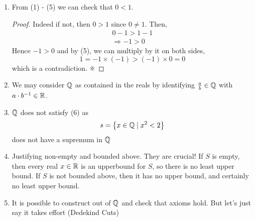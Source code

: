 \documentclass{article}
\begin{document}
\begin{remark}\leavevmode
    \begin{enumerate}
        \item From (1) - (5) we can check that $0 < 1$.
        \begin{proof}
            Indeed if not, then $0 > 1$ since $0 \neq 1$.
            Then,
            \begin{align*}
                0 -1 > 1 - 1 \\
                \Rightarrow -1 > 0
            \end{align*}
            Hence $-1 > 0$ and by (5), we can multiply by it on both sides,
            \[
                1 = -1 \times (-1) > (-1) \times 0 = 0   
            \]
            which is a contradiction. $\contradiction$
        \end{proof}
        \item We may consider $\mathbb{Q}$ as contained in the reals by identifying $\frac{a}{b} \in \mathbb{Q}$ with $a \cdot b^{-1} \in \mathbb{R}$.
        \item $\mathbb{Q}$ does not satisfy (6) as 
        \[
            s = \left\{ x \in \mathbb{Q} \mid x^2 < 2 \right\}  
        \]
        does not have a supremum in $\mathbb{Q}$
        \item Justifying non-empty and bounded above. They are crucial!
        If $S$ is empty, then every real $x \in \mathbb{R}$ is an upperbound for $S$, so there is no least upper bound.
        If $S$ is not bounded above, then it has no upper bound, and certainly no least upper bound.
        \item It is possible to construct out of $\mathbb{Q}$ and check that axioms hold.
        But let's just say it takes effort (Dedekind Cuts)
    \end{enumerate}
\end{remark}

\end{document}
